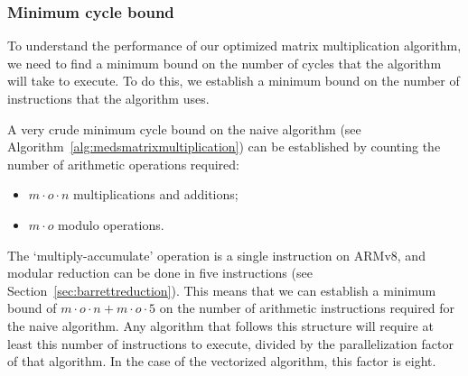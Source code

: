 \documentclass[11pt,a4paper]{report}
\theoremstyle{definition}
\begin{document}
\subsubsection{Minimum cycle bound}
To understand the performance of our optimized matrix multiplication algorithm, we need to find a minimum bound on the number of cycles that the algorithm will take to execute. To do this, we establish a minimum bound on the number of instructions that the algorithm uses.

A very crude minimum cycle bound on the naive algorithm (see Algorithm~\ref{alg:medsmatrixmultiplication}) can be established by counting the number of arithmetic operations required:
\begin{itemize}
  \item $m \cdot o \cdot n$ multiplications and additions;
  \item $m \cdot o$ modulo operations.
\end{itemize}
The `multiply-accumulate' operation is a single instruction on ARMv8, and modular reduction can be done in five instructions (see Section~\ref{sec:barrettreduction}). This means that we can establish a minimum bound of $m \cdot o \cdot n + m \cdot o \cdot 5$ on the number of arithmetic instructions required for the naive algorithm. Any algorithm that follows this structure will require at least this number of instructions to execute, divided by the parallelization factor of that algorithm. In the case of the vectorized algorithm, this factor is eight.
\end{document}
